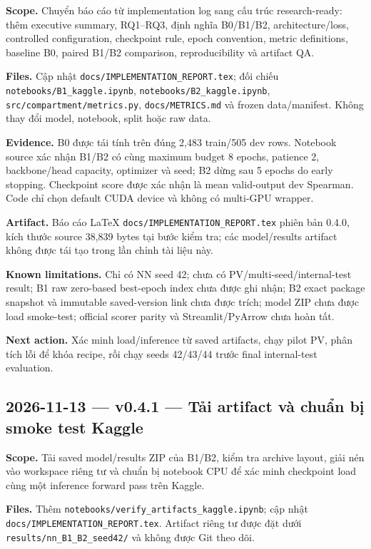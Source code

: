\documentclass[11pt,a4paper]{article}
\newcommand{\code}[1]{\nolinkurl{#1}}
\begin{document}
\textbf{Scope.} Chuyển báo cáo từ implementation log sang cấu trúc research-ready: thêm executive summary, RQ1--RQ3, định nghĩa B0/B1/B2, architecture/loss, controlled configuration, checkpoint rule, epoch convention, metric definitions, baseline B0, paired B1/B2 comparison, reproducibility và artifact QA.

\textbf{Files.} Cập nhật \code{docs/IMPLEMENTATION_REPORT.tex}; đối chiếu \code{notebooks/B1_kaggle.ipynb}, \code{notebooks/B2_kaggle.ipynb}, \code{src/compartment/metrics.py}, \code{docs/METRICS.md} và frozen data/manifest. Không thay đổi model, notebook, split hoặc raw data.

\textbf{Evidence.} B0 được tái tính trên đúng 2,483 train/505 dev rows. Notebook source xác nhận B1/B2 có cùng maximum budget 8 epochs, patience 2, backbone/head capacity, optimizer và seed; B2 dừng sau 5 epochs do early stopping. Checkpoint score được xác nhận là mean valid-output dev Spearman. Code chỉ chọn default CUDA device và không có multi-GPU wrapper.

\textbf{Artifact.} Báo cáo LaTeX \code{docs/IMPLEMENTATION_REPORT.tex} phiên bản 0.4.0, kích thước source 38,839 bytes tại bước kiểm tra; các model/results artifact không được tái tạo trong lần chỉnh tài liệu này.

\textbf{Known limitations.} Chỉ có NN seed 42; chưa có PV/multi-seed/internal-test result; B1 raw zero-based best-epoch index chưa được ghi nhận; B2 exact package snapshot và immutable saved-version link chưa được trích; model ZIP chưa được load smoke-test; official scorer parity và Streamlit/PyArrow chưa hoàn tất.

\textbf{Next action.} Xác minh load/inference từ saved artifacts, chạy pilot PV, phân tích lỗi để khóa recipe, rồi chạy seeds 42/43/44 trước final internal-test evaluation.

\subsection*{2026-11-13 --- v0.4.1 --- Tải artifact và chuẩn bị smoke test Kaggle}

\textbf{Scope.} Tải saved model/results ZIP của B1/B2, kiểm tra archive layout, giải nén vào workspace riêng tư và chuẩn bị notebook CPU để xác minh checkpoint load cùng một inference forward pass trên Kaggle.

\textbf{Files.} Thêm \code{notebooks/verify_artifacts_kaggle.ipynb}; cập nhật \code{docs/IMPLEMENTATION_REPORT.tex}. Artifact riêng tư được đặt dưới \code{results/nn_B1_B2_seed42/} và không được Git theo dõi.
\end{document}
